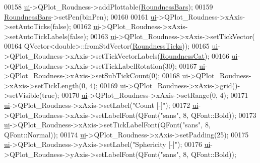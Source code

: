 \begin{DoxyCode}
{00158   \hyperlink{class_v_s_a_main_window_a958a0581d2bf1bfe020c3b5d8f738640}{ui}->QPlot\_Roudness->addPlottable(\hyperlink{class_v_s_a_main_window_afe7a5404f6f35af0c40eb277d91b82ac}{RoundnessBars});
00159   \hyperlink{class_v_s_a_main_window_afe7a5404f6f35af0c40eb277d91b82ac}{RoundnessBars}->setPen(binPen);
00160 
00161   \hyperlink{class_v_s_a_main_window_a958a0581d2bf1bfe020c3b5d8f738640}{ui}->QPlot\_Roudness->xAxis->setAutoTicks(\textcolor{keyword}{false});
00162   \hyperlink{class_v_s_a_main_window_a958a0581d2bf1bfe020c3b5d8f738640}{ui}->QPlot\_Roudness->xAxis->setAutoTickLabels(\textcolor{keyword}{false});
00163   \hyperlink{class_v_s_a_main_window_a958a0581d2bf1bfe020c3b5d8f738640}{ui}->QPlot\_Roudness->xAxis->setTickVector(
00164       QVector<double>::fromStdVector(\hyperlink{class_v_s_a_main_window_ace4471ce32443a495cd2c2bb500bef7d}{RoundnessTicks}));
00165   \hyperlink{class_v_s_a_main_window_a958a0581d2bf1bfe020c3b5d8f738640}{ui}->QPlot\_Roudness->xAxis->setTickVectorLabels(\hyperlink{class_v_s_a_main_window_a8e54a490d67520e7dedd06addd3eaaa9}{RoundnessCat});
00166   \hyperlink{class_v_s_a_main_window_a958a0581d2bf1bfe020c3b5d8f738640}{ui}->QPlot\_Roudness->xAxis->setTickLabelRotation(30);
00167   \hyperlink{class_v_s_a_main_window_a958a0581d2bf1bfe020c3b5d8f738640}{ui}->QPlot\_Roudness->xAxis->setSubTickCount(0);
00168   \hyperlink{class_v_s_a_main_window_a958a0581d2bf1bfe020c3b5d8f738640}{ui}->QPlot\_Roudness->xAxis->setTickLength(0, 4);
00169   \hyperlink{class_v_s_a_main_window_a958a0581d2bf1bfe020c3b5d8f738640}{ui}->QPlot\_Roudness->xAxis->grid()->setVisible(\textcolor{keyword}{true});
00170   \hyperlink{class_v_s_a_main_window_a958a0581d2bf1bfe020c3b5d8f738640}{ui}->QPlot\_Roudness->xAxis->setRange(0, 4);
00171   \hyperlink{class_v_s_a_main_window_a958a0581d2bf1bfe020c3b5d8f738640}{ui}->QPlot\_Roudness->xAxis->setLabel(\textcolor{stringliteral}{"Count [-]"});
00172   \hyperlink{class_v_s_a_main_window_a958a0581d2bf1bfe020c3b5d8f738640}{ui}->QPlot\_Roudness->xAxis->setLabelFont(QFont(\textcolor{stringliteral}{"sans"}, 8, QFont::Bold));
00173   \hyperlink{class_v_s_a_main_window_a958a0581d2bf1bfe020c3b5d8f738640}{ui}->QPlot\_Roudness->xAxis->setTickLabelFont(QFont(\textcolor{stringliteral}{"sans"}, 8, QFont::Normal));
00174   \hyperlink{class_v_s_a_main_window_a958a0581d2bf1bfe020c3b5d8f738640}{ui}->QPlot\_Roudness->xAxis->setPadding(25);
00175   \hyperlink{class_v_s_a_main_window_a958a0581d2bf1bfe020c3b5d8f738640}{ui}->QPlot\_Roudness->yAxis->setLabel(\textcolor{stringliteral}{"Sphericity [-]"});
00176   \hyperlink{class_v_s_a_main_window_a958a0581d2bf1bfe020c3b5d8f738640}{ui}->QPlot\_Roudness->yAxis->setLabelFont(QFont(\textcolor{stringliteral}{"sans"}, 8, QFont::Bold));
}
\end{DoxyCode}
